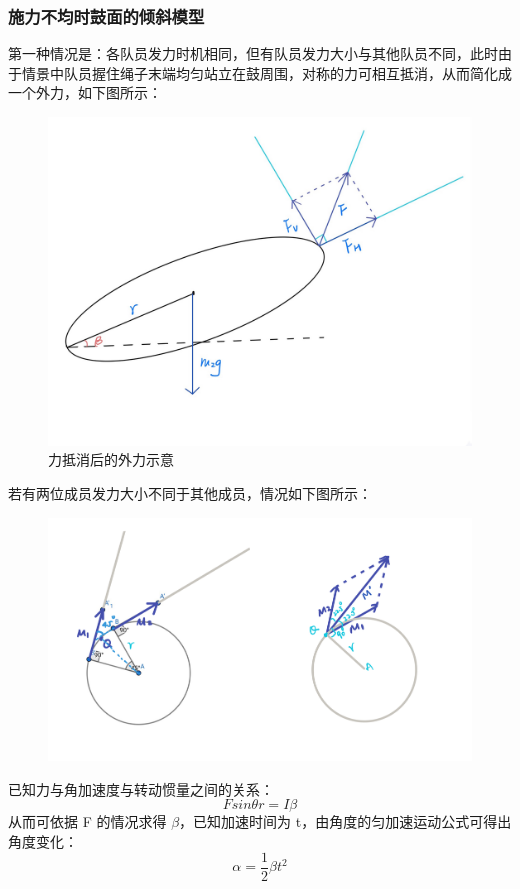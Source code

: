 \documentclass[withoutpreface,bwprint]{cumcmthesis}
\begin{document}
\subsubsection{施力不均时鼓面的倾斜模型}
第一种情况是：各队员发力时机相同，但有队员发力大小与其他队员不同，此时由于情景中队员握住绳子末端均匀站立在鼓周围，对称的力可相互抵消，从而简化成一个外力，如下图所示：
\begin{figure}[H]
	\centering
	\includegraphics[scale = 0.14]{IMG_0017.jpg}
	\caption{力抵消后的外力示意}
\end{figure}
若有两位成员发力大小不同于其他成员，情况如下图所示：
\begin{figure}[H]
	\centering
	\includegraphics[scale = 0.28]{IMG_6F4646E3A079-1.jpeg}
\end{figure}
已知力与角加速度与转动惯量之间的关系：
\[Fsin\theta{r} = I\beta\]
从而可依据 F 的情况求得 $\beta$，已知加速时间为 t，由角度的匀加速运动公式可得出角度变化：
\[\alpha = \frac{1}{2}\beta{t}^2\]
\end{document}
